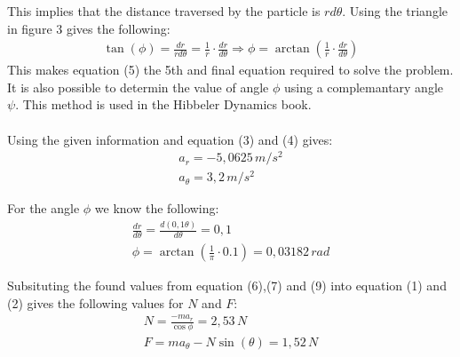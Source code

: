 \documentclass[11pt, a4paper]{article}
\begin{document}
This implies that the distance traversed by the particle is $rd\theta$. Using the triangle in 
figure 3 gives the following:
\begin{gather}
    \tan(\phi) = \frac{dr}{rd\theta} = \frac{1}{r} \cdot \frac{dr}{d\theta} \Rightarrow
    \phi = \arctan \left( \frac{1}{r} \cdot \frac{dr}{d\theta} \right)
\end{gather}
This makes equation (5) the 5th and final equation required to solve the problem. It is also possible to
determin the value of angle $\phi$ using a complemantary angle $\psi$. This method is used in the Hibbeler Dynamics book.\\
\\
Using the given information and equation (3) and (4) gives:
\begin{gather}
    a_r = -5,0625\,m/s^2\\
    a_\theta = 3,2\,m/s^2
\end{gather}

For the angle $\phi$ we know the following:
\begin{gather}
    \frac{dr}{d\theta} = \frac{d(0,1\theta)}{d\theta} = 0,1 \\
    \phi = \arctan \left(\frac{1}{\pi} \cdot 0.1 \right) = 0,03182\,rad
\end{gather}

Subsituting the found values from equation (6),(7) and (9) into equation (1) and (2)
gives the following values for $N$ and $F$:
\begin{gather}
    N = \frac{-ma_r}{\cos{\phi}} = 2,53\,N\\
    F = ma_\theta - N\sin(\theta) = 1,52\,N
\end{gather}
\end{document}
